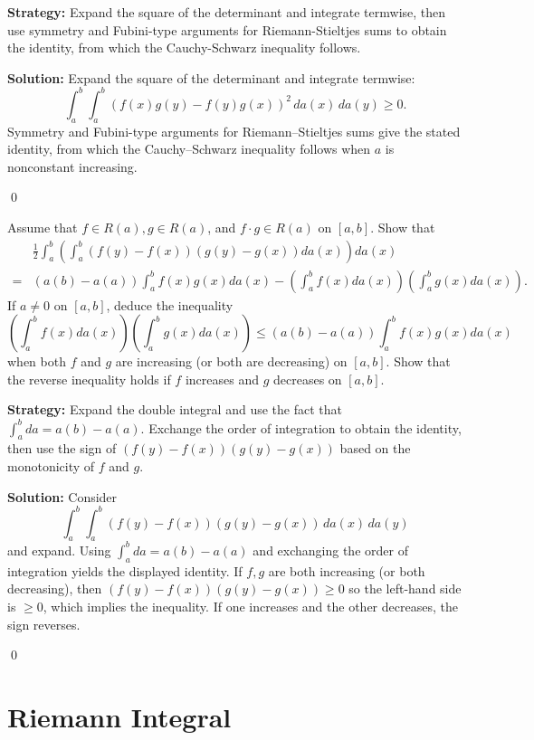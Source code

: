 \noindent\textbf{Strategy:} Expand the square of the determinant and integrate termwise, then use symmetry and Fubini-type arguments for Riemann-Stieltjes sums to obtain the identity, from which the Cauchy-Schwarz inequality follows.

\bigskip\noindent\textbf{Solution:}
Expand the square of the determinant and integrate termwise:
\[\int_a^b\int_a^b (f(x)g(y)-f(y)g(x))^2\,da(x)\,da(y)\ge 0.
\]
Symmetry and Fubini-type arguments for Riemann–Stieltjes sums give the stated identity, from which the Cauchy–Schwarz inequality follows when $a$ is nonconstant increasing.




\qed
\begin{problembox}
\begin{problemstatement}
Assume that $f \in R(a), g \in R(a)$, and $f \cdot g \in R(a)$ on $[a, b]$. Show that
\begin{align*}
&\frac{1}{2} \int_a^b \left( \int_a^b (f(y) - f(x))(g(y) - g(x)) da(x) \right) da(x) \\
=& (a(b) - a(a)) \int_a^b f(x)g(x) da(x) - \left( \int_a^b f(x) da(x) \right) \left( \int_a^b g(x) da(x) \right).
\end{align*}
If $a \neq 0$ on $[a, b]$, deduce the inequality
\[\left( \int_a^b f(x) da(x) \right) \left( \int_a^b g(x) da(x) \right) \leq (a(b) - a(a)) \int_a^b f(x)g(x) da(x)\]
when both $f$ and $g$ are increasing (or both are decreasing) on $[a, b]$. Show that the reverse inequality holds if $f$ increases and $g$ decreases on $[a, b]$.
\end{problemstatement}
\end{problembox}

\noindent\textbf{Strategy:} Expand the double integral and use the fact that $\int_a^b da = a(b) - a(a)$. Exchange the order of integration to obtain the identity, then use the sign of $(f(y) - f(x))(g(y) - g(x))$ based on the monotonicity of $f$ and $g$.

\bigskip\noindent\textbf{Solution:}
Consider
\[\int_a^b\int_a^b (f(y)-f(x))(g(y)-g(x))\,da(x)\,da(y)\]
and expand. Using $\int_a^b da=a(b)-a(a)$ and exchanging the order of integration yields the displayed identity. If $f,g$ are both increasing (or both decreasing), then $(f(y)-f(x))(g(y)-g(x))\ge0$ so the left-hand side is $\ge0$, which implies the inequality. If one increases and the other decreases, the sign reverses.


\qed
\section{Riemann Integral}



